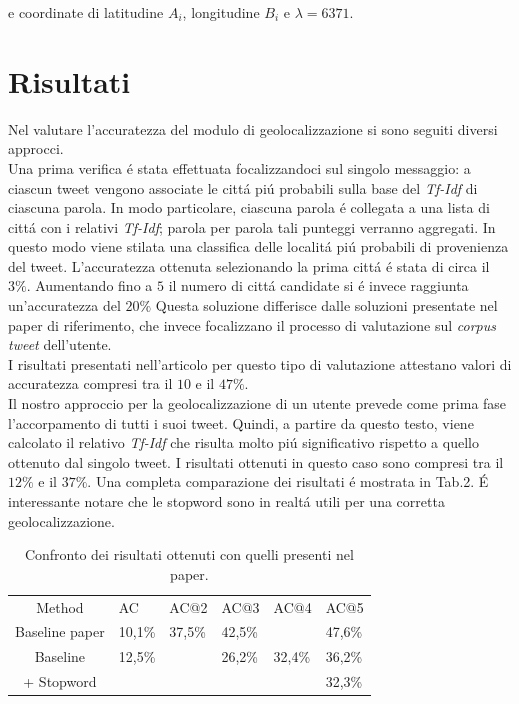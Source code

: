 \documentclass[twocolumn,10pt]{asme2ej}
\begin{document}
e coordinate di latitudine $A_i$, longitudine $B_i$ e $\lambda=6371$. 

\section{Risultati}

Nel valutare l'accuratezza del modulo di geolocalizzazione si sono seguiti diversi approcci. \\Una prima verifica \'e stata effettuata focalizzandoci sul singolo messaggio: a ciascun tweet vengono associate le citt\'a pi\'u probabili sulla base del \textit{Tf-Idf} di ciascuna parola. In modo particolare, ciascuna parola \'e collegata a una lista di citt\'a con i relativi \textit{Tf-Idf}; parola per parola tali punteggi verranno aggregati. In questo modo viene stilata una classifica delle localit\'a pi\'u probabili di provenienza del tweet. L'accuratezza ottenuta selezionando la prima citt\'a \'e stata di circa il $3\%$. Aumentando fino a $5$ il numero di citt\'a candidate si \'e invece raggiunta un'accuratezza del $20\%$ Questa soluzione differisce dalle soluzioni presentate nel paper di riferimento, che invece focalizzano il processo di valutazione sul \textit{corpus tweet} dell'utente. \\I risultati presentati nell'articolo per questo tipo di valutazione attestano   
valori di accuratezza compresi tra il $10$ e il $47\%$.  \\Il nostro approccio per la geolocalizzazione di un utente prevede come prima fase l'accorpamento di tutti i suoi tweet. Quindi, a partire da questo testo, viene calcolato il relativo \textit{Tf-Idf} che risulta molto pi\'u significativo rispetto a quello ottenuto dal singolo tweet. I risultati ottenuti in questo caso sono compresi tra il $12\%$ e il $37\%$. Una completa comparazione dei risultati \'e mostrata in Tab.2. \'E interessante notare che le stopword sono in realt\'a utili per una corretta geolocalizzazione.


\begin{table}[h]
\caption{Confronto dei risultati ottenuti con quelli presenti nel paper.}
\begin{center}
\label{table_ASME}
\begin{tabular}{c l l l l l}
& & \\ %
\hline
Method & AC &  AC@2 &  AC@3 & AC@4 &  AC@5 \\
\hline
Baseline paper &  10,1\% &  37,5\% &  42,5\% & & 47,6\% \\
Baseline  &  12,5\% &    &  26,2\% & 32,4\% & 36,2\% \\
+ Stopword &   &    &  &  & 32,3\% \\

\hline
\end{tabular}
\end{center}
\end{table}
\end{document}
